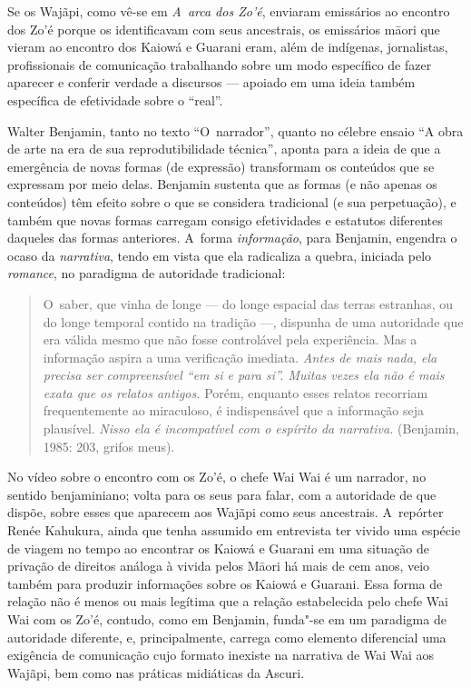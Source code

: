 Se os Wajãpi, como vê-se em \emph{A~arca dos Zo’é}, enviaram emissários ao
encontro dos Zo’é porque os identificavam com seus ancestrais, os
emissários m\=aori que vieram ao encontro dos Kaiowá e Guarani eram,
além de indígenas, jornalistas, profissionais de comunicação
trabalhando sobre um modo específico de fazer aparecer e conferir
verdade a discursos --- apoiado em uma ideia também específica de
efetividade sobre o ``real''.

Walter Benjamin, tanto no texto ``O~narrador'', quanto no célebre ensaio ``A
obra de arte na era de sua reprodutibilidade técnica'', aponta para a
ideia de que a emergência de novas formas (de expressão) transformam os
conteúdos que se expressam por meio delas. Benjamin sustenta que as
formas (e não apenas os conteúdos) têm efeito sobre o que se considera
tradicional (e sua perpetuação), e também que novas formas carregam
consigo efetividades e estatutos diferentes daqueles das formas
anteriores. A~forma \emph{informação}, para Benjamin, engendra o ocaso da
\emph{narrativa}, tendo em vista que ela radicaliza a quebra, iniciada pelo
\emph{romance}, no paradigma de autoridade tradicional:

\begin{quote}
O~saber, que vinha de longe --- do longe espacial das terras estranhas,
ou do longe temporal contido na tradição ---, dispunha de uma autoridade
que era válida mesmo que não fosse controlável pela experiência. Mas a
informação aspira a uma verificação imediata. \emph{Antes de mais nada,
ela precisa ser compreensível ``em si e para si''. Muitas vezes ela não
é mais exata que os relatos antigos.} Porém, enquanto esses relatos
recorriam frequentemente ao miraculoso, é indispensável que a informação
seja plausível. \emph{Nisso ela é incompatível com o espírito da
narrativa.} (Benjamin, 1985: 203, grifos meus).
\end{quote}

No vídeo sobre o encontro com os Zo’é, o chefe Wai Wai é um narrador, no
sentido benjaminiano; volta para os seus para falar, com a autoridade de que dispõe, sobre esses que aparecem aos Wajãpi como seus
ancestrais. A~repórter Renée Kahukura, ainda que tenha assumido em
entrevista ter vivido uma espécie de viagem no tempo ao encontrar os
Kaiowá e Guarani em uma situação de privação de direitos análoga à
vivida pelos M\=aori há mais de cem anos, veio também para produzir
informações sobre os Kaiowá e Guarani. Essa forma de relação não é
menos ou mais legítima que a relação estabelecida pelo chefe Wai Wai
com os Zo’é, contudo, como em Benjamin, funda"-se em um paradigma de
autoridade diferente, e, principalmente, carrega como elemento
diferencial uma exigência de comunicação cujo formato inexiste na
narrativa de Wai Wai aos Wajãpi, bem como nas práticas midiáticas da
Ascuri.

